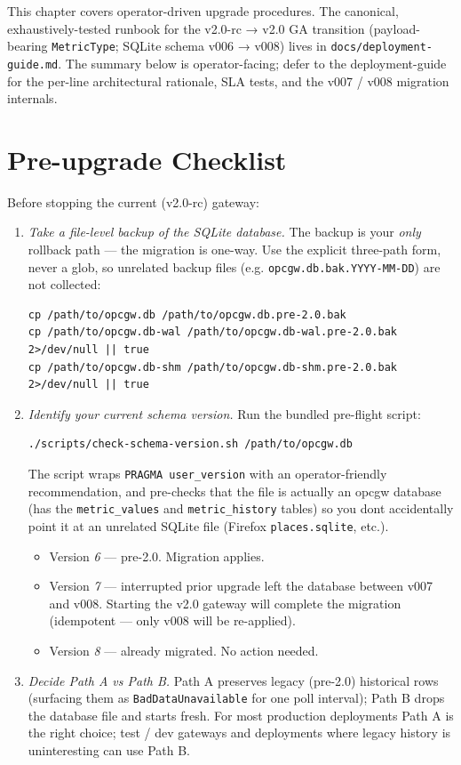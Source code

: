 This chapter covers operator-driven upgrade procedures. The canonical, exhaustively-tested runbook for the v2.0-rc → v2.0 GA transition (payload-bearing \texttt{MetricType}; SQLite schema v006 → v008) lives in \texttt{docs/deployment-guide.md}. The summary below is operator-facing; defer to the deployment-guide for the per-line architectural rationale, SLA tests, and the v007 / v008 migration internals.

\section{Pre-upgrade Checklist}\label{sec-upgrade-pre-flight}

Before stopping the current (v2.0-rc) gateway:

\begin{enumerate}
\def\labelenumi{\arabic{enumi}.}
\item
  \emph{Take a file-level backup of the SQLite database.} The backup is your \emph{only} rollback path --- the migration is one-way. Use the explicit three-path form, never a glob, so unrelated backup files (e.g. \texttt{opcgw.db.bak.YYYY-MM-DD}) are not collected:

\begin{lstlisting}
cp /path/to/opcgw.db /path/to/opcgw.db.pre-2.0.bak
cp /path/to/opcgw.db-wal /path/to/opcgw.db-wal.pre-2.0.bak 2>/dev/null || true
cp /path/to/opcgw.db-shm /path/to/opcgw.db-shm.pre-2.0.bak 2>/dev/null || true
\end{lstlisting}
\item
  \emph{Identify your current schema version.} Run the bundled pre-flight script:

\begin{lstlisting}
./scripts/check-schema-version.sh /path/to/opcgw.db
\end{lstlisting}

  The script wraps \texttt{PRAGMA\ user\_version} with an operator-friendly recommendation, and pre-checks that the file is actually an opcgw database (has the \texttt{metric\_values} and \texttt{metric\_history} tables) so you don\textquotesingle t accidentally point it at an unrelated SQLite file (Firefox \texttt{places.sqlite}, etc.).

  \begin{itemize}
  \item
    Version \emph{6} --- pre-2.0. Migration applies.
  \item
    Version \emph{7} --- interrupted prior upgrade left the database between v007 and v008. Starting the v2.0 gateway will complete the migration (idempotent --- only v008 will be re-applied).
  \item
    Version \emph{8} --- already migrated. No action needed.
  \end{itemize}
\item
  \emph{Decide Path A vs Path B.} Path A preserves legacy (pre-2.0) historical rows (surfacing them as \texttt{BadDataUnavailable} for one poll interval); Path B drops the database file and starts fresh. For most production deployments Path A is the right choice; test / dev gateways and deployments where legacy history is uninteresting can use Path B.
\end{enumerate}

